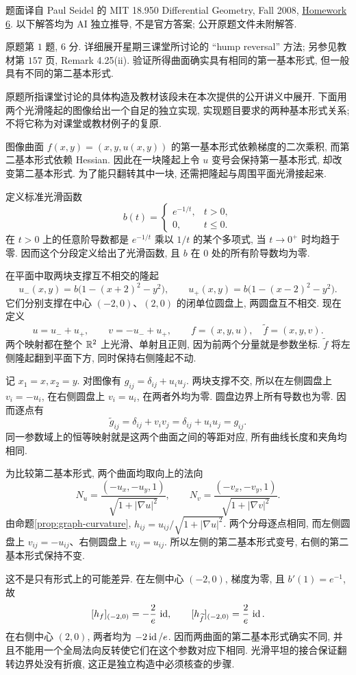\par{}
题面译自 Paul Seidel 的 MIT 18.950 Differential Geometry, Fall 2008,
\href{https://ocw.mit.edu/courses/18-950-differential-geometry-fall-2008/resources/homework6/}{Homework 6}.
以下解答均为 AI 独立推导, 不是官方答案; 公开原题文件未附解答.

\begin{exercise}\label{ps:6-1}
原题第 $1$ 题, $6$ 分. 详细展开星期三课堂所讨论的 ``hump reversal'' 方法; 另参见教材第 $157$ 页, Remark 4.25(ii). 验证所得曲面确实具有相同的第一基本形式, 但一般具有不同的第二基本形式.
\end{exercise}
\begin{remark}
原题所指课堂讨论的具体构造及教材该段未在本次提供的公开讲义中展开. 下面用两个光滑隆起的图像给出一个自足的独立实现, 实现题目要求的两种基本形式关系; 不将它称为对课堂或教材例子的复原.
\end{remark}
\begin{solution}
图像曲面 $f(x,y)=(x,y,u(x,y))$ 的第一基本形式依赖梯度的二次乘积, 而第二基本形式依赖 Hessian. 因此在一块隆起上令 $u$ 变号会保持第一基本形式, 却改变第二基本形式. 为了能只翻转其中一块, 还需把隆起与周围平面光滑接起来.

定义标准光滑函数
\[
 b(t)=\begin{cases}e^{-1/t},&t>0,\\0,&t\le0.\end{cases}
\]
在 $t>0$ 上的任意阶导数都是 $e^{-1/t}$ 乘以 $1/t$ 的某个多项式, 当 $t\to0^+$ 时均趋于零. 因而这个分段定义给出了光滑函数, 且 $b$ 在 $0$ 处的所有阶导数均为零.

在平面中取两块支撑互不相交的隆起
\[
 u_-(x,y)=b\bigl(1-(x+2)^2-y^2\bigr),\qquad
 u_+(x,y)=b\bigl(1-(x-2)^2-y^2\bigr).
\]
它们分别支撑在中心 $(-2,0)$、$(2,0)$ 的闭单位圆盘上, 两圆盘互不相交. 现在定义
\[
 u=u_-+u_+,\qquad v=-u_-+u_+,\qquad
 f=(x,y,u),\quad \widetilde f=(x,y,v).
\]
两个映射都在整个 $\mathbb R^2$ 上光滑、单射且正则, 因为前两个分量就是参数坐标. $\widetilde f$ 将左侧隆起翻到平面下方, 同时保持右侧隆起不动.

记 $x_1=x,x_2=y$. 对图像有 $g_{ij}=\delta_{ij}+u_i u_j$. 两块支撑不交, 所以在左侧圆盘上 $v_i=-u_i$, 在右侧圆盘上 $v_i=u_i$, 在两者外均为零. 圆盘边界上所有导数也为零. 因而逐点有
\[
 \widetilde g_{ij}=\delta_{ij}+v_i v_j
 =\delta_{ij}+u_i u_j=g_{ij}.
\]
同一参数域上的恒等映射就是这两个曲面之间的等距对应, 所有曲线长度和夹角均相同.

为比较第二基本形式, 两个曲面均取向上的法向
\[
 N_u=\frac{(-u_x,-u_y,1)}{\sqrt{1+|\nabla u|^2}},\qquad
 N_v=\frac{(-v_x,-v_y,1)}{\sqrt{1+|\nabla v|^2}}.
\]
由命题\ref{prop:graph-curvature}, $h_{ij}=u_{ij}/\sqrt{1+|\nabla u|^2}$. 两个分母逐点相同, 而左侧圆盘上 $v_{ij}=-u_{ij}$、右侧圆盘上 $v_{ij}=u_{ij}$. 所以左侧的第二基本形式变号, 右侧的第二基本形式保持不变.

这不是只有形式上的可能差异. 在左侧中心 $(-2,0)$, 梯度为零, 且 $b'(1)=e^{-1}$, 故
\[
 [h_f]_{(-2,0)}=-\frac2e\,\operatorname{id},\qquad
 [h_{\widetilde f}]_{(-2,0)}=\frac2e\,\operatorname{id}.
\]
在右侧中心 $(2,0)$, 两者均为 $-2\operatorname{id}/e$. 因而两曲面的第二基本形式确实不同, 并且不能用一个全局法向反转使它们在这个参数对应下相同. 光滑平坦的接合保证翻转边界处没有折痕, 这正是独立构造中必须核查的步骤.
\end{solution}

